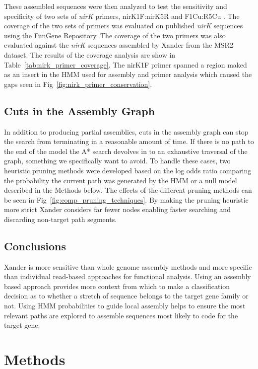 \documentclass[10pt]{bmc_article}
\newenvironment{bmcformat}{\begin{raggedright}\baselineskip20pt\sloppy\setboolean{publ}{false}}{\end{raggedright}\baselineskip20pt\sloppy}
\begin{document}
\begin{bmcformat}
These assembled sequences were then analyzed to test the sensitivity and specificity of two sets of \emph{nirK} primers, nirK1F:nirK5R \cite{braker_development_1998} and F1Cu:R5Cu \cite{hallin_pcr_1999}.  The coverage of the two sets of primers was evaluated on published \emph{nirK} sequences using the FunGene Repository.  The coverage of the two primers was also evaluated against the \emph{nirK} sequences assembled by Xander from the MSR2 dataset.  The results of the coverage analysis are show in Table~\ref{tab:nirk_primer_coverage}.  The nirK1F primer spanned a region maked as an insert in the HMM used for assembly and primer analysis which caused the gaps seen in Fig~\ref{fig:nirk_primer_conservation}.

\subsection*{Cuts in the Assembly Graph}

In addition to producing partial assemblies, cuts in the assembly graph can stop the search from terminating in a reasonable amount of time. If there is no path to the end of the model the A* search devolves in to an exhaustive traversal of the graph, something we specifically want to avoid.  To handle these cases, two heuristic pruning methods were developed based on the log odds ratio comparing the probability the current path was generated by the HMM or a null model described in the Methods below.  The effects of the different pruning methods can be seen in Fig~\ref{fig:comp_pruning_techniques}.  By making the pruning heuristic more strict Xander considers far fewer nodes enabling faster searching and discarding non-target path segments.

\subsection*{Conclusions}
Xander is more sensitive than whole genome assembly methods and more specific than individual read-based approaches for functional analysis.  Using an assembly based approach provides more context from which to make a classification decision as to whether a stretch of sequence belongs to the target gene family or not.  Using HMM probabilities to guide local assembly helps to ensure the most relevant paths are explored to assemble sequences most likely to code for the target gene.
  
\section*{Methods}

\end{bmcformat}
\end{document}
